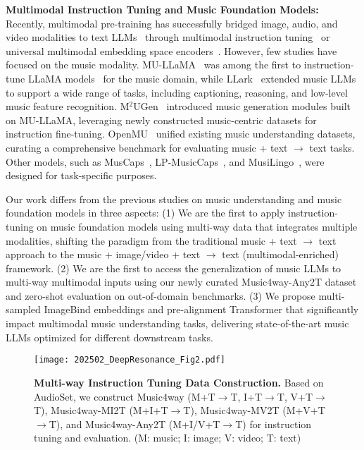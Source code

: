 \noindent \textbf{Multimodal Instruction Tuning and Music Foundation Models:}
Recently, multimodal pre-training has successfully bridged image, audio, and video modalities to text LLMs~\cite{DBLP:conf/iclr/TangYSC000M024,DBLP:conf/icml/Wu0Q0C24,DBLP:conf/iclr/0001LLKG24,DBLP:conf/cvpr/TangYKLZB24} through multimodal instruction tuning~\cite{DBLP:conf/nips/LiuLWL23a,DBLP:journals/corr/abs-2307-08581} or universal multimodal embedding space encoders~\cite{DBLP:conf/cvpr/GirdharELSAJM23,DBLP:conf/iclr/ZhuLNYCWPJZLZ0024}. However, few studies have focused on the music modality. MU-LLaMA~\cite{DBLP:conf/icassp/LiuHSS24} was among the first to instruction-tune LLaMA models~\cite{DBLP:journals/corr/abs-2302-13971} for the music domain, while LLark~\cite{DBLP:conf/icml/GardnerDSB24} extended music LLMs to support a wide range of tasks, including captioning, reasoning, and low-level music feature recognition. M$^2$UGen~\cite{DBLP:journals/corr/abs-2311-11255} introduced music generation modules built on MU-LLaMA, leveraging newly constructed music-centric datasets for instruction fine-tuning. OpenMU~\cite{DBLP:journals/corr/abs-2410-15573} unified existing music understanding datasets, curating a comprehensive benchmark for evaluating music + text $\xrightarrow{}$ text tasks. Other models, such as MusCaps~\cite{DBLP:conf/ijcnn/MancoBQF21}, LP-MusicCaps~\cite{DBLP:conf/ismir/DohCLN23}, and MusiLingo~\cite{deng-etal-2024-musilingo}, were designed for task-specific purposes.

Our work differs from the previous studies on music understanding and music foundation models in three aspects: (1) We are the first to apply instruction-tuning on music foundation models using multi-way data that integrates multiple modalities, shifting the paradigm from the traditional music + text $\xrightarrow{}$ text approach to the music + image/video + text $\xrightarrow{}$ text (multimodal-enriched) framework. (2) We are the first to access the generalization of music LLMs to multi-way multimodal inputs using our newly curated Music4way-Any2T dataset and zero-shot evaluation on out-of-domain benchmarks. (3) We propose multi-sampled ImageBind embeddings and pre-alignment Transformer that significantly impact multimodal music understanding tasks, delivering state-of-the-art music LLMs optimized for different downstream tasks.

\begin{figure*}[t]
    \centering
    \texttt{[image: 202502\_DeepResonance\_Fig2.pdf]}
    \caption{\textbf{Multi-way Instruction Tuning Data Construction.} Based on AudioSet, we construct Music4way (M+T$\xrightarrow{}$T, I+T$\xrightarrow{}$T, V+T$\xrightarrow{}$T), Music4way-MI2T (M+I+T$\xrightarrow{}$T), Music4way-MV2T (M+V+T$\xrightarrow{}$T), and Music4way-Any2T (M+I/V+T$\xrightarrow{}$T) for instruction tuning and evaluation. (M: music; I: image; V: video; T: text)}
    \label{fig:data}
\end{figure*}